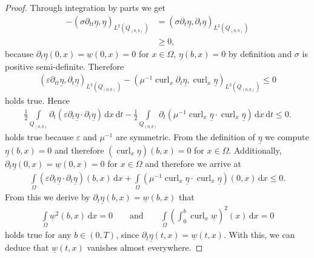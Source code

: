 \documentclass[a4paper,11pt]{article}
\newcommand{\cu}{\operatorname{curl}}
\renewcommand{\vec}[1]{\underline{#1}}
\begin{document}
\begin{proof}
	Through integration by parts we get
	\begin{align*}
		- (\sigma\partial_{tt}\vec \eta, \vec \eta)_{L^2(Q_{(0,b)})}&= (\sigma\partial_{t}\vec \eta,\partial_{t} \vec \eta)_{L^2(Q_{(0,b)})}\\
		&\geq  0,
	\end{align*}
	because $\partial_t\vec \eta(0,x) =\vec w(0,x) = 0$ for $x\in\Omega$, $\vec \eta(b,x) = 0$ by definition and $\sigma$ is positive semi-definite. Therefore 
	\begin{align*}
		(\varepsilon\partial_{tt}\vec \eta,\partial_t\vec  \eta)_{L^2(Q_{(0,b)})} - (\mu^{-1}	\cu_x \partial_t\vec  \eta, \cu_x \vec \eta)_{L^2(Q_{(0,b)})} \leq 0
	\end{align*}
	holds true. Hence
	\begin{align*}
		\frac{1}{2}\int\limits_{Q_{(0,b)}} \partial_t(\varepsilon\partial_{t}\vec \eta\cdot\partial_{t}\vec \eta ) \,\mathrm dx\,\mathrm dt- \frac{1}{2} \int\limits_{Q_{(0,b)}} \partial_t(\mu^{-1}\cu_x  \vec \eta\cdot\cu_x  \vec \eta )\,\mathrm dx\,\mathrm dt \leq 0.
	\end{align*}
	holds true  because $\varepsilon$ and $\mu^{-1}$ are symmetric. From the definition of $\vec \eta$ we compute $\vec \eta(b,x)= 0$ and therefore $(\cu_x\vec \eta)(b,x) = 0$  for $x\in \Omega$. Additionally, $\partial_t\vec \eta(0,x) =\vec w(0,x) = 0$ for $x\in\Omega$  and therefore we arrive at
	\begin{align*}
		\int\limits_{\Omega} (\varepsilon\partial_{t}\vec \eta\cdot\partial_{t}\vec \eta) (b,x)\,\mathrm dx 
		+  \int\limits_{\Omega} (\mu^{-1}\cu_x \vec \eta\cdot\cu_x \vec \eta )(0,x)\,\mathrm dx\leq 0.
	\end{align*}
	From this we derive by  $\partial_t\vec \eta(b,x) =\vec w(b,x)$ that
	\begin{align*}
		\int\limits_{\Omega} \vec w^2 (b,x)\,\mathrm dx = 0\qquad \text{and}\qquad	\int\limits_{\Omega}\left( \int_0^b \cu_x\vec w \right)^2 (x)\,\mathrm dx = 0
	\end{align*}
	holds true for any $b\in(0,T)$, since $\partial_t \vec\eta (t,x)= \vec w(t,x)$. With this, we can deduce that $\vec w(t,x)$ vanishes almost everywhere.	
\end{proof}
\end{document}
